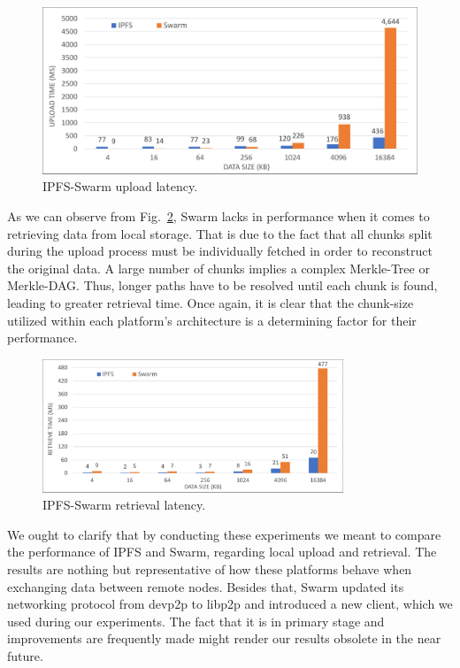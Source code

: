 \begin{figure}[htbp]
\centerline{\includegraphics[width=\textwidth]{figs/ipfs_swarm_upload.pdf}}
\caption{IPFS-Swarm upload latency.}
\label{fig: ipfs_swarm_upload}
\end{figure}
\setlength{\belowcaptionskip}{-10pt}

As we can observe from Fig.~\ref{fig: ipfs_swarm_retrieve}, Swarm lacks in performance when it comes to retrieving data from local storage. That is due to the fact that all chunks split during the upload process must be individually fetched in order to reconstruct the original data. A large number of chunks implies a complex Merkle-Tree or Merkle-DAG. Thus, longer paths have to be resolved until each chunk is found, leading to greater retrieval time. Once again, it is clear that the chunk-size utilized within each platform’s architecture is a determining factor for their performance.

\begin{figure}[htbp]
\centerline{\includegraphics[width=9cm]{figs/ipfs_swarm_retrieve.pdf}}
\caption{IPFS-Swarm retrieval latency.}
\label{fig: ipfs_swarm_retrieve}
\end{figure}
\setlength{\belowcaptionskip}{-10pt}

We ought to clarify that by conducting these experiments we meant to compare the performance of IPFS and Swarm, regarding local upload and retrieval. The results are nothing but representative of how these platforms behave when exchanging data between remote nodes. Besides that, Swarm updated its networking protocol from devp2p to libp2p and introduced a new client, which we used during our experiments. The fact that it is in primary stage and improvements are frequently made might render our results obsolete in the near future.
